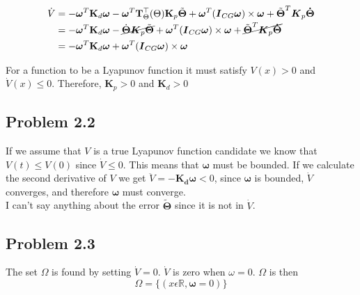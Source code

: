 \begin{equation}
\begin{align}
    \dot{V} &=   -\boldsymbol{\omega}^T\mathbf{K}_d \boldsymbol{\omega} -\boldsymbol{\omega}^T\mathbf{T}_{\Theta}^{\top}(\Theta) \mathbf{K}_p \tilde{\boldsymbol{\Theta}} + \boldsymbol{\omega}^T(\boldsymbol{I}_{CG}\boldsymbol{\omega})\times \boldsymbol{\omega}  + \tilde{\boldsymbol{\Theta}}^T\boldsymbol{K}_p\boldsymbol{\dot{\Theta}}\\
    &= -\boldsymbol{\omega}^T\mathbf{K}_d \boldsymbol{\omega} - \cancel{\dot{\boldsymbol{\Theta}} \boldsymbol{K}_p \tilde{\boldsymbol{\Theta}}} + \boldsymbol{\omega}^T(\boldsymbol{I}_{CG}\boldsymbol{\omega})\times \boldsymbol{\omega}  + \cancel{\tilde{\boldsymbol{\Theta}}^T\boldsymbol{K}_p\boldsymbol{\dot{\Theta}}}\\
    &=-\boldsymbol{\omega}^T\mathbf{K}_d \boldsymbol{\omega} + \boldsymbol{\omega}^T(\boldsymbol{I}_{CG}\boldsymbol{\omega})\times \boldsymbol{\omega}
\end{align}
\end{equation}

For a function to be a Lyapunov function it must satisfy $V(x)>0$ and $\dot{V}(x)\le 0$. Therefore, $\boldsymbol{K}_p>0$ and $\boldsymbol{K}_d > 0$ 

\subsection*{Problem 2.2}

If we assume that $V$ is a true Lyapunov function candidate we know that \\$V(t)\le V(0)$ since $\dot{V} \le 0$. This means that $\boldsymbol{\omega}$ must be bounded. If we calculate the second derivative of $V$ we get $\ddot{V} = -\boldsymbol{K_d\omega}< 0$, since $\boldsymbol{\omega}$ is bounded, $\dot{V}$ converges, and therefore $\boldsymbol{\omega}$ must converge. \\
I can't say anything about the error $\boldsymbol{\tilde{\Theta}}$ since it is not in $\dot{V}$. 

\subsection*{Problem 2.3}
The set $\Omega$ is found by setting $\dot{V}=0$. $\dot{V}$ is zero when $\omega = 0$. $\Omega$ is then 
\begin{equation}
\Omega = \{ (x\epsilon \mathbb{R},\boldsymbol{\omega}=0) \}
\end{equation}

